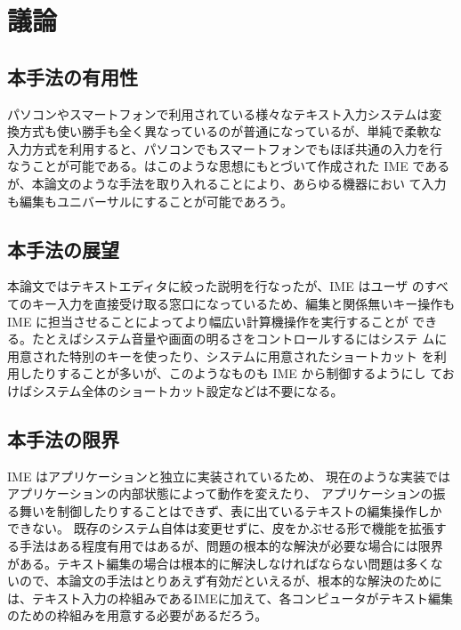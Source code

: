 \section{議論}

\subsection{本手法の有用性}
パソコンやスマートフォンで利用されている様々なテキスト入力システムは変
換方式も使い勝手も全く異なっているのが普通になっているが、単純で柔軟な
入力方式を利用すると、パソコンでもスマートフォンでもほぼ共通の入力を行
なうことが可能である。{\system}はこのような思想にもとづいて作成された IME
であるが、本論文のような手法を取り入れることにより、あらゆる機器におい
て入力も編集もユニバーサルにすることが可能であろう。

\subsection{本手法の展望}
本論文ではテキストエディタに絞った説明を行なったが、IME はユーザ
のすべてのキー入力を直接受け取る窓口になっているため、編集と関係無いキー操作も IME に担当させることによってより幅広い計算機操作を実行することが
できる。たとえばシステム音量や画面の明るさをコントロールするにはシステ
ムに用意された特別のキーを使ったり、システムに用意されたショートカット
を利用したりすることが多いが、このようなものも IME から制御するようにし
ておけばシステム全体のショートカット設定などは不要になる。

\subsection{本手法の限界}

IME はアプリケーションと独立に実装されているため、
現在のような実装ではアプリケーションの内部状態によって動作を変えたり、
アプリケーションの振る舞いを制御したりすることはできず、表に出ているテキストの編集操作しか
できない。 既存のシステム自体は変更せずに、皮をかぶせる形で機能を拡張す
る手法はある程度有用ではあるが、問題の根本的な解決が必要な場合には限界
がある。テキスト編集の場合は根本的に解決しなければならない問題は多くな
いので、本論文の手法はとりあえず有効だといえるが、根本的な解決のために
は、テキスト入力の枠組みであるIMEに加えて、各コンピュータがテキスト編集
のための枠組みを用意する必要があるだろう。
